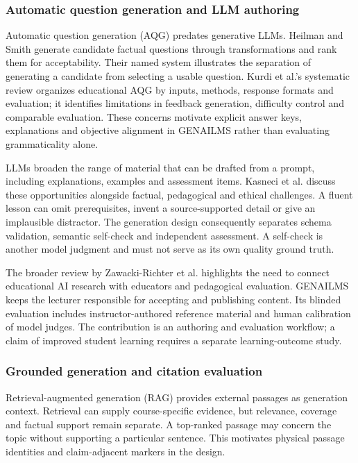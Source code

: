 \subsubsection{Automatic question generation and LLM authoring}
Automatic question generation (AQG) predates generative LLMs. Heilman and Smith generate candidate factual questions through transformations and rank them for acceptability\citep{heilman}. Their named system illustrates the separation of generating a candidate from selecting a usable question. Kurdi et al.'s systematic review organizes educational AQG by inputs, methods, response formats and evaluation; it identifies limitations in feedback generation, difficulty control and comparable evaluation\citep{aqgreview}. These concerns motivate explicit answer keys, explanations and objective alignment in GENAILMS rather than evaluating grammaticality alone.

LLMs broaden the range of material that can be drafted from a prompt, including explanations, examples and assessment items. Kasneci et al. discuss these opportunities alongside factual, pedagogical and ethical challenges\citep{llmed}. A fluent lesson can omit prerequisites, invent a source-supported detail or give an implausible distractor. The generation design consequently separates schema validation, semantic self-check and independent assessment. A self-check is another model judgment and must not serve as its own quality ground truth.

The broader review by Zawacki-Richter et al. highlights the need to connect educational AI research with educators and pedagogical evaluation\citep{aiedreview}. GENAILMS keeps the lecturer responsible for accepting and publishing content. Its blinded evaluation includes instructor-authored reference material and human calibration of model judges. The contribution is an authoring and evaluation workflow; a claim of improved student learning requires a separate learning-outcome study.
\subsubsection{Grounded generation and citation evaluation}
Retrieval-augmented generation (RAG) provides external passages as generation context\citep{rag}. Retrieval can supply course-specific evidence, but relevance, coverage and factual support remain separate. A top-ranked passage may concern the topic without supporting a particular sentence. This motivates physical passage identities and claim-adjacent markers in the design.

